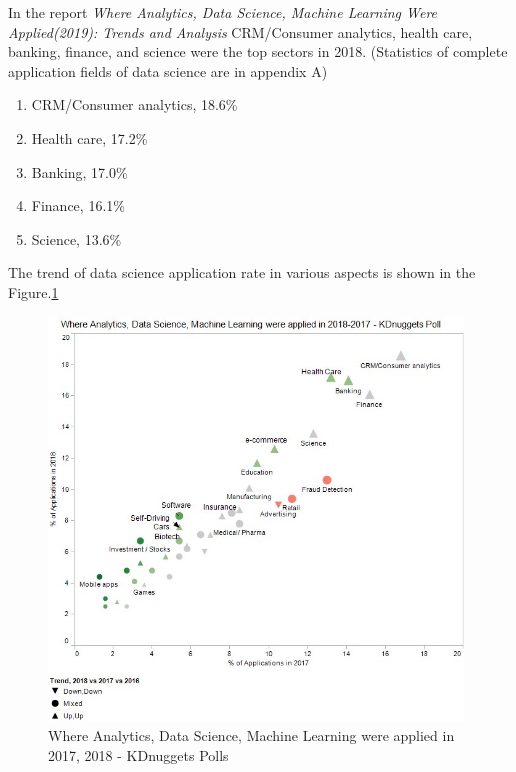 \documentclass[a4paper, 11pt,twoside=true]{scrartcl}
\begin{document}
\quad In the report \textit{Where Analytics, Data Science, Machine Learning Were Applied(2019): Trends and Analysis}  CRM/Consumer analytics, health care, banking, finance, and science were the top sectors in 2018. (Statistics of complete application fields of data science are in appendix A)
\begin{enumerate}
\item CRM/Consumer analytics, 18.6\%\\
\item Health care, 17.2\%\\
\item Banking, 17.0\%\\
\item Finance, 16.1\%\\
\item Science, 13.6\%\\
\end{enumerate}
The trend of data science application rate in various aspects is shown in the Figure.\ref{P1F1}

\begin{figure}[h]
	\small
	\centering
	\includegraphics[width=11cm]{P1F1}
	\caption{Where Analytics, Data Science, Machine Learning were applied in 2017, 2018 - KDnuggets Polls} \label{P1F1}
\end{figure}
\end{document}
